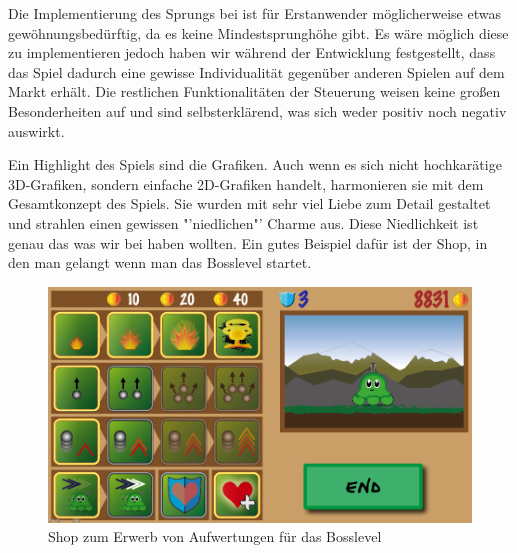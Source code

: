Die Implementierung des Sprungs bei \gamename ist für Erstanwender möglicherweise etwas gewöhnungsbedürftig, da es keine Mindestsprunghöhe gibt. Es wäre möglich diese zu implementieren jedoch haben wir während der Entwicklung festgestellt, dass das Spiel dadurch eine gewisse Individualität gegenüber anderen Spielen auf dem Markt erhält. Die restlichen Funktionalitäten der Steuerung weisen keine großen Besonderheiten auf und sind selbsterklärend, was sich weder positiv noch negativ auswirkt.

Ein Highlight des Spiels sind die Grafiken. Auch wenn es sich nicht hochkarätige 3D-Grafiken, sondern einfache 2D-Grafiken handelt, harmonieren sie mit dem Gesamtkonzept des Spiels. Sie wurden mit sehr viel Liebe zum Detail gestaltet und strahlen einen gewissen "'niedlichen"' Charme aus. Diese Niedlichkeit ist genau das was wir bei \gamename haben wollten.
Ein gutes Beispiel dafür ist der Shop, in den man gelangt wenn man das Bosslevel startet. 

\begin{figure}[H]
\centering
\includegraphics[width=14cm]{resources/shop}
\caption{Shop zum Erwerb von Aufwertungen für das Bosslevel}
\label{fig: shop}
\end{figure}
